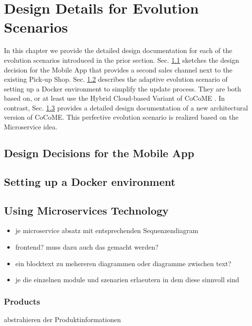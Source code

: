 \section{Design Details for Evolution Scenarios}
In this chapter we provide the detailed design documentation for each of the evolution scenarios
introduced in the prior section. Sec. \ref{App} sketches the design decision for the Mobile App that provides a second sales channel next to the existing Pick-up Shop. Sec. \ref{Docker} describes the adaptive evolution scenario of setting up a Docker environment to simplify the update process. They are both based on, or at least use the Hybrid Cloud-based Variant of CoCoME \cite{SWB-469002735}. In contrast, Sec. \ref{MS} provides a detailed design documentation of a new architectural version of CoCoME. This perfective evolution scenario is realized based on the Microservice idea.

\subsection{Design Decisions for the Mobile App} \label{App}


\subsection{Setting up a Docker environment} \label{Docker}
	
	
\subsection{Using Microservices Technology} \label{MS}
	\begin{itemize}
		\item je microservice absatz mit entsprechenden Sequenzendiagram %
		\item frontend? muss dazu auch das gemacht werden?
		\item ein blocktext zu mehereren diagrammen oder diagramme zwischen text?
		
	
			\item je die einzelnen module und szenarien erlaeutern in dem diese sinnvoll sind
	\end{itemize}
	
		\subsubsection{Products}
		abstrahieren der Produktinformationen 
		
